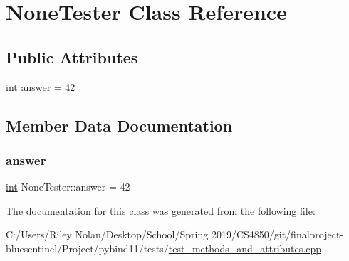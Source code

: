 \hypertarget{class_none_tester}{}\section{None\+Tester Class Reference}
\label{class_none_tester}
\subsection*{Public Attributes}
\begin{DoxyCompactItemize}
\item 
\mbox{\hyperlink{warnings_8h_a74f207b5aa4ba51c3a2ad59b219a423b}{int}} \mbox{\hyperlink{class_none_tester_aec157c824653accc91167a3219cbb2b0}{answer}} = 42
\end{DoxyCompactItemize}


\subsection{Member Data Documentation}
\mbox{\label{class_none_tester_aec157c824653accc91167a3219cbb2b0}} 
\subsubsection{\texorpdfstring{answer}{answer}}
{\footnotesize\ttfamily \mbox{\hyperlink{warnings_8h_a74f207b5aa4ba51c3a2ad59b219a423b}{int}} None\+Tester\+::answer = 42}



The documentation for this class was generated from the following file\+:\begin{DoxyCompactItemize}
\item 
C\+:/\+Users/\+Riley Nolan/\+Desktop/\+School/\+Spring 2019/\+C\+S4850/git/finalproject-\/bluesentinel/\+Project/pybind11/tests/\mbox{\hyperlink{test__methods__and__attributes_8cpp}{test\+\_\+methods\+\_\+and\+\_\+attributes.\+cpp}}\end{DoxyCompactItemize}
